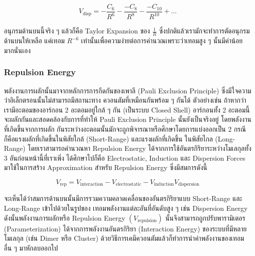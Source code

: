 \begin{equation}
  \label{eq:dispersion_energy_expansion}
  V_{\text{disp}}
  =
  - \frac{C_{6}}{R^{6}}
  - \frac{-C_{8}}{R^{8}}
  - \frac{-C_{10}}{R^{10}}
  + \dots
\end{equation}

\noindent อนุกรมด้านบนนี้จริง ๆ แล้วก็คือ Taylor Expansion ของ $\frac{1}{R}$ ซึ่งปกติแล้วเรามักจะทำการตัดอนุกรมด้านบนให้เหลือ%
แค่เทอม $R^{-6}$ เท่านั้นเพื่อความง่ายต่อการคำนวณเพราะว่าเทอมสูง ๆ นั้นมีค่าน้อยมากนั่นเอง

\subsubsection{Repulsion Energy}

พลังงานการผลักนั้นมาจากหลักการการกีดกันของเพาลี (Pauli Exclusion Principle) ซึ่งมีใจความว่าอิเล็กตรอนนั้นไม่สามารถมีสถานะทาง%
ควอนตัมที่เหมือนกันพร้อม ๆ กันได้ ตัวอย่างเช่น ถ้าหากว่าเรามีอะตอมของอาร์กอน 2 อะตอมอยู่ใกล้ ๆ กัน (เป็นระบบ Closed Shell)
อาร์กอนทั้ง 2 อะตอมนี้จะผลักกันและสอดคล้องกับการที่ทำให้ Pauli Exclusion Principle นั้นยังเป็นจริงอยู่ โดยพลังงานที่เกิดขึ้นจากการผลัก%
กันระหว่างอะตอมนั้นมักจะถูกพิจารณาหรือศึกษาโดยการแบ่งออกเป็น 2 กรณี ก็คือแรงผลักที่เกิดขึ้นในพิสัยใกล้ (Short-Range) และแรงผลักที่เกิดขึ้น%
ในพิสัยไกล (Long-Range) โดยเราสามารถคำนวณหา Repulsion Energy ได้จากการใช้อันตรกิริยาระหว่างโมเลกุลทั้ง 3 อันก่อนหน้านี้ที่เราเพิ่ง%
ได้ศึกษาไปก็คือ Electrostatic, Induction และ Dispersion Forces มาใช้ในการสร้าง Approximation สำหรับ Repulsion Energy
ซึ่งมีสมการดังนี้

\begin{equation}
  V_{\text{rep}}
  =
  V_{\text{interaction}}
  - V_{\text{electrostatic}}
  - V_{\text{induction}}
  V_{\text{dispersion}}
\end{equation}

\noindent จะเห็นได้ว่าสมการด้านบนนั้นมีการรวมความคลาดเคลื่อนของอันตรกิริยาแบบ Short-Range และ Long-Range เข้าไปด้วยในรูปของ%
เทอมพลังงานแต่ละอันที่อันดับสูง ๆ เช่น Dispersion Energy ดังนั้นพลังงานการผลักหรือ Repulsion Energy $(V_{\text{repulsion}})$
นั้นจึงสามารถถูกปรับพารามิเตอร (Parameterization) ได้จากการพลังงานอันตรกิริยา (Interaction Energy) ของระบบที่มีหลายโมเลกุล
(เช่น Dimer หรือ Cluster) ด้วยวิธีการเคมีควอนตัมแล้วก็ทำการนำค่าพลังงานของเทอมอื่น ๆ มาหักลบออกไป

